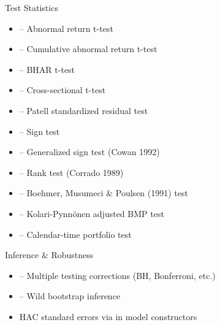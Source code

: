 \documentclass[a4paper]{book}
\begin{document}
%
\begin{Section}{Test Statistics}

\begin{itemize}

\item{}  -- Abnormal return t-test
\item{}  -- Cumulative abnormal return t-test
\item{}  -- BHAR t-test

\end{itemize}

\begin{itemize}

\item{}  -- Cross-sectional t-test
\item{}  -- Patell standardized residual test
\item{}  -- Sign test
\item{}  -- Generalized sign test (Cowan 1992)
\item{}  -- Rank test (Corrado 1989)
\item{}  -- Boehmer, Musumeci \& Poulsen (1991) test
\item{}  -- Kolari-Pynnönen adjusted BMP test
\item{}  -- Calendar-time portfolio test

\end{itemize}

\end{Section}
%
\begin{Section}{Inference \& Robustness}

\begin{itemize}

\item{}  -- Multiple testing corrections (BH, Bonferroni, etc.)
\item{}  -- Wild bootstrap inference
\item{} HAC standard errors via  in model constructors

\end{itemize}

\end{Section}
\end{document}
